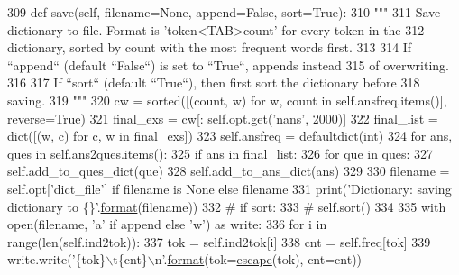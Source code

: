 \begin{DoxyCode}
309     \textcolor{keyword}{def }save(self, filename=None, append=False, sort=True):
310         \textcolor{stringliteral}{"""}
311 \textcolor{stringliteral}{        Save dictionary to file. Format is 'token<TAB>count' for every token in the}
312 \textcolor{stringliteral}{        dictionary, sorted by count with the most frequent words first.}
313 \textcolor{stringliteral}{}
314 \textcolor{stringliteral}{        If ``append`` (default ``False``) is set to ``True``, appends instead}
315 \textcolor{stringliteral}{        of overwriting.}
316 \textcolor{stringliteral}{}
317 \textcolor{stringliteral}{        If ``sort`` (default ``True``), then first sort the dictionary before}
318 \textcolor{stringliteral}{        saving.}
319 \textcolor{stringliteral}{        """}
320         cw = sorted([(count, w) \textcolor{keywordflow}{for} w, count \textcolor{keywordflow}{in} self.ansfreq.items()], reverse=\textcolor{keyword}{True})
321         final\_exs = cw[: self.opt.get(\textcolor{stringliteral}{'nans'}, 2000)]
322         final\_list = dict([(w, c) \textcolor{keywordflow}{for} c, w \textcolor{keywordflow}{in} final\_exs])
323         self.ansfreq = defaultdict(int)
324         \textcolor{keywordflow}{for} ans, ques \textcolor{keywordflow}{in} self.ans2ques.items():
325             \textcolor{keywordflow}{if} ans \textcolor{keywordflow}{in} final\_list:
326                 \textcolor{keywordflow}{for} que \textcolor{keywordflow}{in} ques:
327                     self.add\_to\_ques\_dict(que)
328                 self.add\_to\_ans\_dict(ans)
329 
330         filename = self.opt[\textcolor{stringliteral}{'dict\_file'}] \textcolor{keywordflow}{if} filename \textcolor{keywordflow}{is} \textcolor{keywordtype}{None} \textcolor{keywordflow}{else} filename
331         print(\textcolor{stringliteral}{'Dictionary: saving dictionary to \{\}'}.\hyperlink{namespaceparlai_1_1chat__service_1_1services_1_1messenger_1_1shared__utils_a32e2e2022b824fbaf80c747160b52a76}{format}(filename))
332         \textcolor{comment}{# if sort:}
333         \textcolor{comment}{#     self.sort()}
334 
335         with open(filename, \textcolor{stringliteral}{'a'} \textcolor{keywordflow}{if} append \textcolor{keywordflow}{else} \textcolor{stringliteral}{'w'}) \textcolor{keyword}{as} write:
336             \textcolor{keywordflow}{for} i \textcolor{keywordflow}{in} range(len(self.ind2tok)):
337                 tok = self.ind2tok[i]
338                 cnt = self.freq[tok]
339                 write.write(\textcolor{stringliteral}{'\{tok\}\(\backslash\)t\{cnt\}\(\backslash\)n'}.\hyperlink{namespaceparlai_1_1chat__service_1_1services_1_1messenger_1_1shared__utils_a32e2e2022b824fbaf80c747160b52a76}{format}(tok=\hyperlink{namespaceparlai_1_1tasks_1_1vqa__v1_1_1agents_a09703660c96aab40da3aa7f2386486cb}{escape}(tok), cnt=cnt))

\end{DoxyCode}
